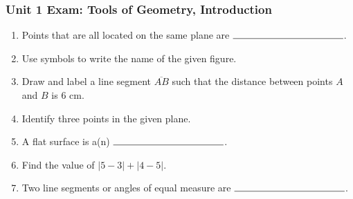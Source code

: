 \documentclass[12pt, oneside]{article}
\begin{document}
  \subsubsection*{Unit 1 Exam: Tools of Geometry, Introduction}
    \vspace{0.5cm}
    \begin{enumerate}
      \item Points that are all located on the same plane are $\rule{4cm}{0.15mm}$.\bigskip


      \item Use symbols to write the name of the given figure.
         \bigskip

      \item Draw and label a line segment $\overline{AB}$ such that the distance between points $A$ and $B$ is 6 cm. \vspace{2cm}


      \item Identify three points in the given plane.\\[0.25in]


      \item A flat surface is a(n) $\rule{4cm}{0.15mm}$. \bigskip

      \item Find the value of $|5-3|+|4-5|$. \bigskip

      \item Two line segments or angles of equal measure are $\rule{4cm}{0.15mm}$.
        \bigskip


\end{enumerate}
\end{document}
